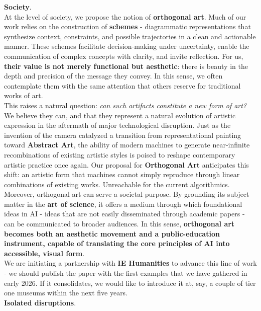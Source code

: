 \documentclass{article}
\begin{document}
\textbf{Society}.\\

At the level of society, we propose the notion of \textbf{orthogonal art}. Much of our work relies on the construction of \textbf{schemes} - diagrammatic representations that synthesize context, constraints, and possible trajectories in a clean and actionable manner. These schemes facilitate decision-making under uncertainty, enable the communication of complex concepts with clarity, and invite reflection. For us, \textbf{their value is not merely functional but aesthetic}: there is beauty in the depth and precision of the message they convey. In this sense, we often contemplate them with the same attention that others reserve for traditional works of art.\\

This raises a natural question: \textit{can such artifacts constitute a new form of art?} We believe they can, and that they represent a natural evolution of artistic expression in the aftermath of major technological disruption. Just as the invention of the camera catalyzed a transition from representational painting toward \textbf{Abstract Art}, the ability of modern machines to generate near-infinite recombinations of existing artistic styles is poised to reshape contemporary artistic practice once again. Our proposal for \textbf{Orthogonal Art} anticipates this shift: an artistic form that machines cannot simply reproduce through linear combinations of existing works. Unreachable for the current algorithmics.\\

Moreover, orthogonal art can serve a societal purpose. By grounding its subject matter in the \textbf{art of science}, it offers a medium through which foundational ideas in AI - ideas that are not easily disseminated through academic papers - can be communicated to broader audiences. In this sense, \textbf{orthogonal art becomes both an aesthetic movement and a public-education instrument, capable of translating the core principles of AI into accessible, visual form}.\\

We are initiating a partnership with \textbf{IE Humanities} to advance this line of work - we should publish the paper with the first examples that we have gathered in early 2026. If it consolidates, we would like to introduce it at, say, a couple of tier one museums within the next five years.\\

\textbf{Isolated disruptions}.\\
\end{document}
